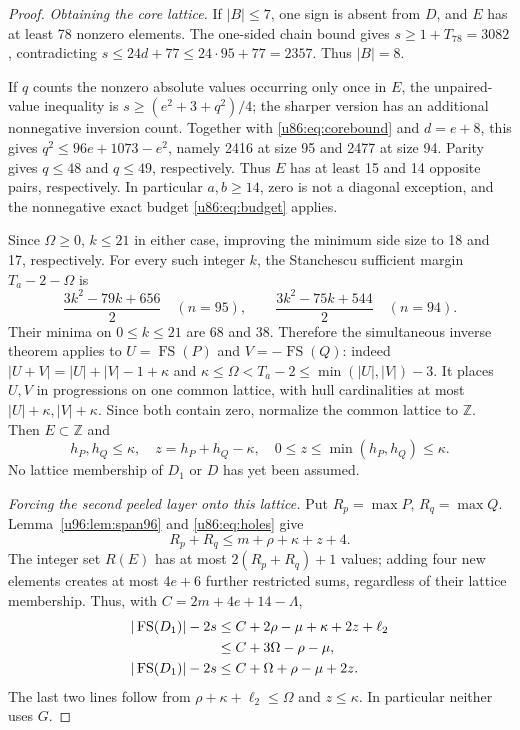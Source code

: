 \documentclass[11pt,a4paper]{article}
\theoremstyle{remark}
\newcommand{\FS}{\operatorname{FS}}
\newcommand{\Z}{\mathbb Z}
\begin{document}
\begin{proof}
\emph{Obtaining the core lattice.}
If $|B|\le7$, one sign is absent from $D$, and $E$ has at least 78
nonzero elements. The one-sided chain bound gives
$s\ge1+T_{78}=3082$, contradicting
$s\le24d+77\le24\cdot95+77=2357$. Thus $|B|=8$.

If $q$ counts the nonzero absolute values occurring only once in $E$,
the unpaired-value inequality is
$s\ge(e^2+3+q^2)/4$; the sharper version has an additional nonnegative
inversion count. Together with \eqref{u86:eq:corebound} and $d=e+8$, this gives
$q^2\le96e+1073-e^2$, namely 2416 at size 95 and 2477 at size 94.
Parity gives $q\le48$ and $q\le49$, respectively. Thus $E$ has at least
15 and 14 opposite pairs, respectively. In particular $a,b\ge14$, zero
is not a diagonal exception, and the nonnegative exact budget
\eqref{u86:eq:budget} applies.

Since $\Omega\ge0$, $k\le21$ in either case, improving the minimum side
size to 18 and 17, respectively. For every such integer $k$, the
Stanchescu sufficient margin $T_a-2-\Omega$ is
\[
 \frac{3k^2-79k+656}{2}\quad(n=95),\qquad
 \frac{3k^2-75k+544}{2}\quad(n=94).
\]
Their minima on $0\le k\le21$ are 68 and 38. Therefore the simultaneous
inverse theorem \cite[Corollary 2]{Stanchescu1996} applies to
$U=\FS(P)$ and $V=-\FS(Q)$: indeed
$|U+V|=|U|+|V|-1+\kappa$ and
$\kappa\le\Omega<T_a-2\le\min(|U|,|V|)-3$.
It places $U,V$ in progressions on one common lattice, with hull
cardinalities at most $|U|+\kappa,|V|+\kappa$. Since both contain zero,
normalize the common lattice to $\Z$. Then $E\subset\Z$ and
\begin{equation}\label{u86:eq:holes}
 h_P,h_Q\le\kappa,\quad z=h_P+h_Q-\kappa,\quad
 0\le z\le\min(h_P,h_Q)\le\kappa.
\end{equation}
No lattice membership of $D_1$ or $D$ has yet been assumed.

\emph{Forcing the second peeled layer onto this lattice.}
Put $R_p=\max P$, $R_q=\max Q$. Lemma~\ref{u96:lem:span96} and
\eqref{u86:eq:holes} give
\begin{equation}\label{u86:eq:Rsum}
 R_p+R_q\le m+\rho+\kappa+z+4.
\end{equation}
The integer set $R(E)$ has at most $2(R_p+R_q)+1$ values; adding four
new elements creates at most $4e+6$ further restricted sums, regardless
of their lattice membership. Thus, with $C=2m+4e+14-\Lambda$,
\begin{align}
 |\FS(D_1)|-2s
 &\le C+2\rho-\mu+\kappa+2z+\ell_2\notag\\
 &\le C+3\Omega-\rho-\mu,\label{u86:eq:latt3}\\
 |\FS(D_1)|-2s
 &\le C+\Omega+\rho-\mu+2z.\label{u86:eq:latt1}
\end{align}
The last two lines follow from $\rho+\kappa+\ell_2\le\Omega$ and
$z\le\kappa$. In particular neither uses $G$.


\end{proof}
\end{document}
